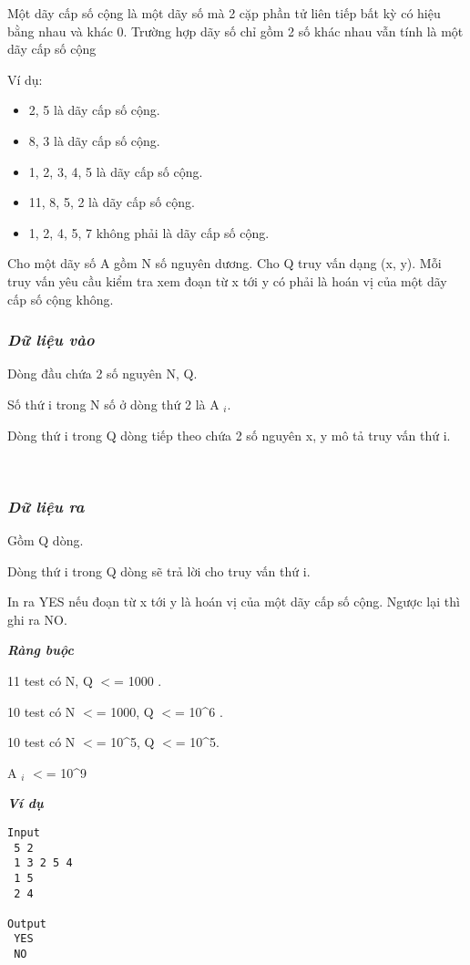 

Một dãy cấp số cộng là một dãy số mà 2 cặp phần tử liên tiếp bất kỳ có hiệu bằng nhau và khác 0. Trường hợp dãy số chỉ gồm 2 số khác nhau vẫn tính là một dãy cấp số cộng

Ví dụ:
\begin{itemize}
	\item 2, 5 là dãy cấp số cộng.
	\item 8, 3 là dãy cấp số cộng.
	\item 1, 2, 3, 4, 5 là dãy cấp số cộng.
	\item 11, 8, 5, 2 là dãy cấp số cộng.
	\item 1, 2, 4, 5, 7 không phải là dãy cấp số cộng.
\end{itemize}

Cho một dãy số A gồm N số nguyên dương. Cho Q truy vấn dạng (x, y). Mỗi truy vấn yêu cầu kiểm tra xem đoạn từ x tới y có phải là hoán vị của một dãy cấp số cộng không.

\subsubsection{\emph{Dữ liệu vào }}

Dòng đầu chứa 2 số nguyên N, Q.

Số thứ i trong N số ở dòng thứ 2 là A $_ i. $

Dòng thứ i trong Q dòng tiếp theo chứa 2 số nguyên x, y mô tả truy vấn thứ i.

 

\subsubsection{\emph{Dữ liệu ra }}

Gồm Q dòng.

Dòng thứ i trong Q dòng sẽ trả lời cho truy vấn thứ i.

In ra YES nếu đoạn từ x tới y là hoán vị của một dãy cấp số cộng. Ngược lại thì ghi ra NO.

\emph{\textbf{Ràng buộc }}

11 test có N, Q $<$= 1000 .

10 test có N $<$= 1000, Q $<$= 10\textasciicircum6 .

10 test có N $<$= 10\textasciicircum5, Q $<$= 10\textasciicircum5.

A $_ i $ $<$= 10\textasciicircum9

\emph{\textbf{Ví dụ }}
\begin{verbatim}
Input
 5 2
 1 3 2 5 4
 1 5
 2 4

Output
 YES
 NO


\end{verbatim}

 